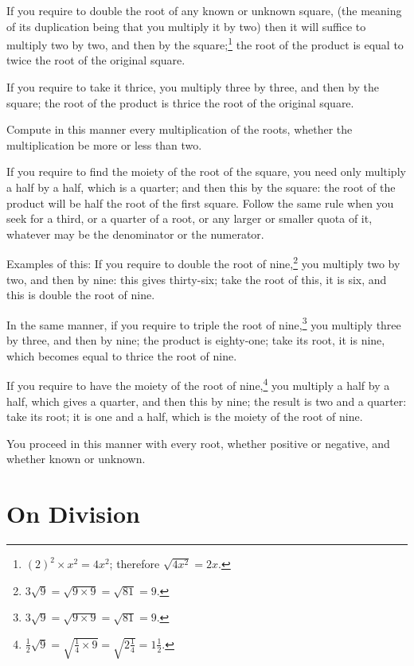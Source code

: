 If you require to double the root of any known or unknown square, (the meaning of its duplication being that you multiply it by two) then it will suffice to multiply two by two, and then by the square;\footnote{$(2)^2 \times x^2 = 4x^2$; therefore $\sqrt{4x^2} = 2x$.} the root of the product is equal to twice the root of the original square.

If you require to take it thrice, you multiply three by three, and then by the square; the root of the product is thrice the root of the original square.

Compute in this manner every multiplication of the roots, whether the multiplication be more or less than two.

If you require to find the moiety of the root of the square, you need only multiply a half by a half, which is a quarter; and then this by the square: the root of the product will be half the root of the first square. Follow the same rule when you seek for a third, or a quarter of a root, or any larger or smaller quota of it, whatever may be the denominator or the numerator.

Examples of this: If you require to double the root of nine,\footnote{$3\sqrt{9} = \sqrt{9 \times 9} = \sqrt{81} = 9$.} you multiply two by two, and then by nine: this gives thirty-six; take the root of this, it is six, and this is double the root of nine.

In the same manner, if you require to triple the root of nine,\footnote{$3\sqrt{9} = \sqrt{9 \times 9} = \sqrt{81} = 9$.} you multiply three by three, and then by nine; the product is eighty-one; take its root, it is nine, which becomes equal to thrice the root of nine.

If you require to have the moiety of the root of nine,\footnote{$\frac{1}{2}\sqrt{9} = \sqrt{\frac{1}{4} \times 9} = \sqrt{2\frac{1}{4}} = 1\frac{1}{2}$.} you multiply a half by a half, which gives a quarter, and then this by nine; the result is two and a quarter: take its root; it is one and a half, which is the moiety of the root of nine.

You proceed in this manner with every root, whether positive or negative, and whether known or unknown.

\clearpage

\section*{On Division}

